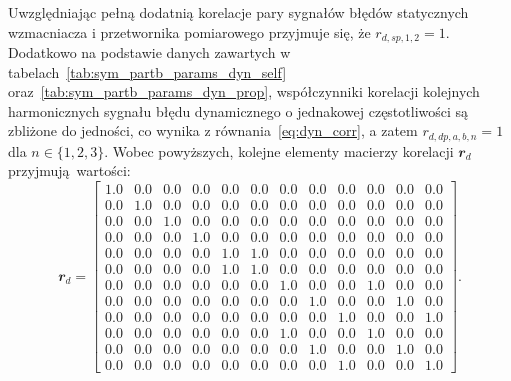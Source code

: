 Uwzględniając pełną dodatnią korelacje pary sygnałów błędów statycznych wzmacniacza i przetwornika pomiarowego przyjmuje się, że $r_{d,sp,1,2} = 1$. Dodatkowo na podstawie danych zawartych w tabelach~\ref{tab:sym_partb_params_dyn_self} oraz~\ref{tab:sym_partb_params_dyn_prop}, współczynniki korelacji kolejnych harmonicznych sygnału błędu dynamicznego o jednakowej częstotliwości są zbliżone do jedności, co wynika z równania~\eqref{eq:dyn_corr}, a zatem $r_{d,dp,a,b,n} = 1$ dla $n \in \{ 1, 2, 3 \}$. Wobec powyższych, kolejne elementy macierzy korelacji $\mathbfit{r}_{d}$ przyjmują wartości:
\begin{equation}
\mathbfit{r}_{d} =
\begin{bmatrix}
\num{1.0} & \num{0.0} & \num{0.0} & \num{0.0} & \num{0.0} & \num{0.0} & \num{0.0} & \num{0.0} & \num{0.0} & \num{0.0} & \num{0.0} & \num{0.0} \\
\num{0.0} & \num{1.0} & \num{0.0} & \num{0.0} & \num{0.0} & \num{0.0} & \num{0.0} & \num{0.0} & \num{0.0} & \num{0.0} & \num{0.0} & \num{0.0} \\
\num{0.0} & \num{0.0} & \num{1.0} & \num{0.0} & \num{0.0} & \num{0.0} & \num{0.0} & \num{0.0} & \num{0.0} & \num{0.0} & \num{0.0} & \num{0.0} \\
\num{0.0} & \num{0.0} & \num{0.0} & \num{1.0} & \num{0.0} & \num{0.0} & \num{0.0} & \num{0.0} & \num{0.0} & \num{0.0} & \num{0.0} & \num{0.0} \\
\num{0.0} & \num{0.0} & \num{0.0} & \num{0.0} & \num{1.0} & \num{1.0} & \num{0.0} & \num{0.0} & \num{0.0} & \num{0.0} & \num{0.0} & \num{0.0} \\
\num{0.0} & \num{0.0} & \num{0.0} & \num{0.0} & \num{1.0} & \num{1.0} & \num{0.0} & \num{0.0} & \num{0.0} & \num{0.0} & \num{0.0} & \num{0.0} \\
\num{0.0} & \num{0.0} & \num{0.0} & \num{0.0} & \num{0.0} & \num{0.0} & \num{1.0} & \num{0.0} & \num{0.0} & \num{1.0} & \num{0.0} & \num{0.0} \\
\num{0.0} & \num{0.0} & \num{0.0} & \num{0.0} & \num{0.0} & \num{0.0} & \num{0.0} & \num{1.0} & \num{0.0} & \num{0.0} & \num{1.0} & \num{0.0} \\
\num{0.0} & \num{0.0} & \num{0.0} & \num{0.0} & \num{0.0} & \num{0.0} & \num{0.0} & \num{0.0} & \num{1.0} & \num{0.0} & \num{0.0} & \num{1.0} \\
\num{0.0} & \num{0.0} & \num{0.0} & \num{0.0} & \num{0.0} & \num{0.0} & \num{1.0} & \num{0.0} & \num{0.0} & \num{1.0} & \num{0.0} & \num{0.0} \\
\num{0.0} & \num{0.0} & \num{0.0} & \num{0.0} & \num{0.0} & \num{0.0} & \num{0.0} & \num{1.0} & \num{0.0} & \num{0.0} & \num{1.0} & \num{0.0} \\
\num{0.0} & \num{0.0} & \num{0.0} & \num{0.0} & \num{0.0} & \num{0.0} & \num{0.0} & \num{0.0} & \num{1.0} & \num{0.0} & \num{0.0} & \num{1.0}
\end{bmatrix}
\label{eq:sym_partd_output_coher_list}.
\end{equation}

